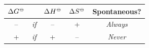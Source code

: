\documentclass[
  9pt,
]{extbook}
\theoremstyle{definition}
\theoremstyle{definition}
\theoremstyle{definition}
\theoremstyle{remark}
\begin{document}
\begin{longtable}[]{@{}clccc@{}}
\toprule
\begin{minipage}[b]{0.15\columnwidth}\centering
\(\Delta G^{-\kern-6pt{\ominus}\kern-6pt-}\)\strut
\end{minipage} & \begin{minipage}[b]{0.03\columnwidth}\raggedright
\strut
\end{minipage} & \begin{minipage}[b]{0.15\columnwidth}\centering
\(\Delta H^{-\kern-6pt{\ominus}\kern-6pt-}\)\strut
\end{minipage} & \begin{minipage}[b]{0.15\columnwidth}\centering
\(\Delta S^{-\kern-6pt{\ominus}\kern-6pt-}\)\strut
\end{minipage} & \begin{minipage}[b]{0.38\columnwidth}\centering
Spontaneous?\strut
\end{minipage}\tabularnewline
\midrule
\endhead
\begin{minipage}[t]{0.15\columnwidth}\centering
--\strut
\end{minipage} & \begin{minipage}[t]{0.03\columnwidth}\raggedright
\emph{if}\strut
\end{minipage} & \begin{minipage}[t]{0.15\columnwidth}\centering
--\strut
\end{minipage} & \begin{minipage}[t]{0.15\columnwidth}\centering
+\strut
\end{minipage} & \begin{minipage}[t]{0.38\columnwidth}\centering
\emph{Always}\strut
\end{minipage}\tabularnewline
\begin{minipage}[t]{0.15\columnwidth}\centering
+\strut
\end{minipage} & \begin{minipage}[t]{0.03\columnwidth}\raggedright
\emph{if}\strut
\end{minipage} & \begin{minipage}[t]{0.15\columnwidth}\centering
+\strut
\end{minipage} & \begin{minipage}[t]{0.15\columnwidth}\centering
--\strut
\end{minipage} & \begin{minipage}[t]{0.38\columnwidth}\centering
\emph{Never}\strut
\end{minipage}\tabularnewline

\end{longtable}
\end{document}
